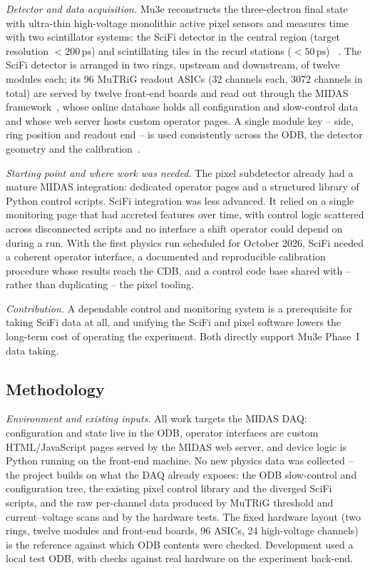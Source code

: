\documentclass[12pt,a4paper]{article}
\newcommand{\pill}[1]{\textit{#1}\;}   %
\begin{document}
\pill{Detector and data acquisition.}
Mu3e reconstructs the three-electron final state with ultra-thin high-voltage
monolithic active pixel sensors and measures time with two scintillator systems:
the SciFi detector in the central region (target resolution $<200\,\mathrm{ps}$)
and scintillating tiles in the recurl stations ($<50\,\mathrm{ps}$)%
~\cite{bravar,vigani}. The SciFi detector is arranged in two rings, upstream and
downstream, of twelve modules each; its 96 MuTRiG readout ASICs (32 channels
each, 3072 channels in total) are served by twelve front-end boards and read out
through the MIDAS framework~\cite{koppel}, whose online database holds all
configuration and slow-control data and whose web server hosts custom operator
pages. A single module key -- side, ring position and readout end -- is used
consistently across the ODB, the detector geometry and the
calibration~\cite{wang}.

\pill{Starting point and where work was needed.}
The pixel subdetector already had a mature MIDAS integration: dedicated operator
pages and a structured library of Python control scripts. SciFi integration was
less advanced. It relied on a single monitoring page that had accreted features
over time, with control logic scattered across disconnected scripts and no
interface a shift operator could depend on during a run. With the first physics
run scheduled for October 2026, SciFi needed a coherent operator interface, a
documented and reproducible calibration procedure whose results reach the CDB,
and a control code base shared with -- rather than duplicating -- the pixel
tooling.

\pill{Contribution.}
A dependable control and monitoring system is a prerequisite for taking SciFi
data at all, and unifying the SciFi and pixel software lowers the long-term cost
of operating the experiment. Both directly support Mu3e Phase~I data taking.

\subsection{Methodology}

\pill{Environment and existing inputs.}
All work targets the MIDAS DAQ: configuration and state live in the ODB,
operator interfaces are custom HTML/JavaScript pages served by the MIDAS web
server, and device logic is Python running on the front-end machine. No new
physics data was collected -- the project builds on what the DAQ already
exposes: the ODB slow-control and configuration tree, the existing pixel control
library and the diverged SciFi scripts, and the raw per-channel data produced by
MuTRiG threshold and current--voltage scans and by the hardware tests. The fixed
hardware layout (two rings, twelve modules and front-end boards, 96 ASICs, 24
high-voltage channels) is the reference against which ODB contents were checked.
Development used a local test ODB, with checks against real hardware on the
experiment back-end.
\end{document}
